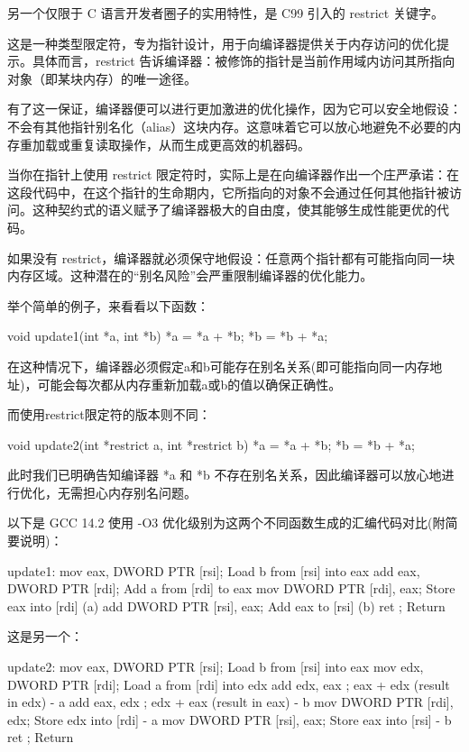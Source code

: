 另一个仅限于 C 语言开发者圈子的实用特性，是 C99 引入的 restrict 关键字。

这是一种类型限定符，专为指针设计，用于向编译器提供关于内存访问的优化提示。具体而言，restrict 告诉编译器：被修饰的指针是当前作用域内访问其所指向对象（即某块内存）的唯一途径。

有了这一保证，编译器便可以进行更加激进的优化操作，因为它可以安全地假设：不会有其他指针别名化（alias）这块内存。这意味着它可以放心地避免不必要的内存重加载或重复读取操作，从而生成更高效的机器码。

当你在指针上使用 restrict 限定符时，实际上是在向编译器作出一个庄严承诺：在这段代码中，在这个指针的生命期内，它所指向的对象不会通过任何其他指针被访问。这种契约式的语义赋予了编译器极大的自由度，使其能够生成性能更优的代码。

如果没有 restrict，编译器就必须保守地假设：任意两个指针都有可能指向同一块内存区域。这种潜在的“别名风险”会严重限制编译器的优化能力。

举个简单的例子，来看看以下函数：

\begin{cpp}
void update1(int *a, int *b) {
  *a = *a + *b;
  *b = *b + *a;
}
\end{cpp}

在这种情况下，编译器必须假定a和b可能存在别名关系(即可能指向同一内存地址)，可能会每次都从内存重新加载a或b的值以确保正确性。

而使用restrict限定符的版本则不同：

\begin{cpp}
void update2(int *restrict a, int *restrict b) {
  *a = *a + *b;
  *b = *b + *a;
}
\end{cpp}

此时我们已明确告知编译器 *a 和 *b 不存在别名关系，因此编译器可以放心地进行优化，无需担心内存别名问题。

以下是 GCC 14.2 使用 -O3 优化级别为这两个不同函数生成的汇编代码对比(附简要说明)：

\begin{shell}
update1:
  mov eax, DWORD PTR [rsi]; Load b from [rsi] into eax
  add eax, DWORD PTR [rdi]; Add a from [rdi] to eax
  mov DWORD PTR [rdi], eax; Store eax into [rdi] (a)
  add DWORD PTR [rsi], eax; Add eax to [rsi] (b)
  ret ; Return
\end{shell}

这是另一个：

\begin{shell}
update2:
  mov eax, DWORD PTR [rsi]; Load b from [rsi] into eax
  mov edx, DWORD PTR [rdi]; Load a from [rdi] into edx
  add edx, eax ; eax + edx (result in edx) - a
  add eax, edx ; edx + eax (result in eax) - b
  mov DWORD PTR [rdi], edx; Store edx into [rdi] - a
  mov DWORD PTR [rsi], eax; Store eax into [rsi] - b
  ret ; Return
\end{shell}

